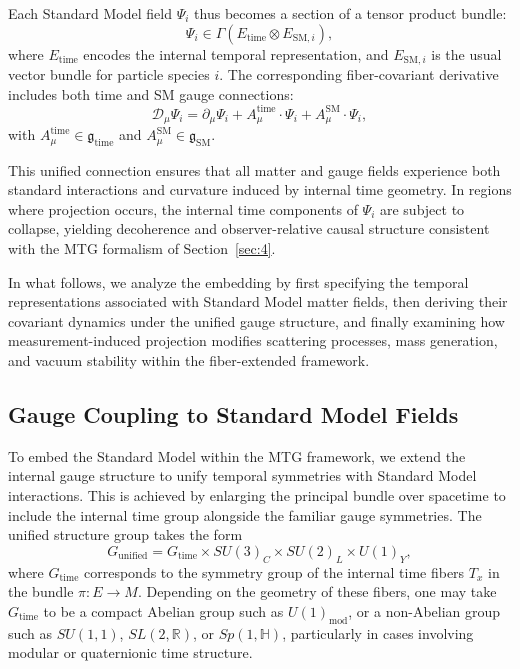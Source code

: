 \documentclass[11pt]{article}
\begin{document}
Each Standard Model field \( \Psi_i \) thus becomes a section of a tensor product bundle:
\begin{equation}
\Psi_i \in \Gamma\left(E_{\mathrm{time}} \otimes E_{\mathrm{SM}, i}\right),
\end{equation}
where \( E_{\mathrm{time}} \) encodes the internal temporal representation, and \( E_{\mathrm{SM}, i} \) is the usual vector bundle for particle species \( i \). The corresponding fiber-covariant derivative includes both time and SM gauge connections:
\begin{equation}
\mathcal{D}_\mu \Psi_i = \partial_\mu \Psi_i + A_\mu^{\mathrm{time}} \cdot \Psi_i + A_\mu^{\mathrm{SM}} \cdot \Psi_i,
\end{equation}
with \( A_\mu^{\mathrm{time}} \in \mathfrak{g}_{\mathrm{time}} \) and \( A_\mu^{\mathrm{SM}} \in \mathfrak{g}_{\mathrm{SM}} \).

This unified connection ensures that all matter and gauge fields experience both standard interactions and curvature induced by internal time geometry. In regions where projection occurs, the internal time components of \( \Psi_i \) are subject to collapse, yielding decoherence and observer-relative causal structure consistent with the MTG formalism of Section~\ref{sec:4}.

In what follows, we analyze the embedding by first specifying the temporal representations associated with Standard Model matter fields, then deriving their covariant dynamics under the unified gauge structure, and finally examining how measurement-induced projection modifies scattering processes, mass generation, and vacuum stability within the fiber-extended framework.
\subsection{Gauge Coupling to Standard Model Fields}
To embed the Standard Model within the MTG framework, we extend the internal gauge structure to unify temporal symmetries with Standard Model interactions. This is achieved by enlarging the principal bundle over spacetime to include the internal time group alongside the familiar gauge symmetries. The unified structure group takes the form
\begin{equation}
G_{\mathrm{unified}} = G_{\mathrm{time}} \times SU(3)_C \times SU(2)_L \times U(1)_Y,
\end{equation}
where \( G_{\mathrm{time}} \) corresponds to the symmetry group of the internal time fibers \( T_x \) in the bundle \( \pi: E \to M \). Depending on the geometry of these fibers, one may take \( G_{\mathrm{time}} \) to be a compact Abelian group such as \( U(1)_{\mathrm{mod}} \), or a non-Abelian group such as \( SU(1,1) \), \( SL(2,\mathbb{R}) \), or \( Sp(1,\mathbb{H}) \), particularly in cases involving modular or quaternionic time structure.
\end{document}
